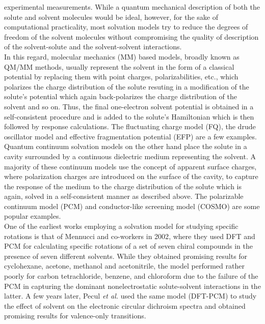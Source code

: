 experimental measurements. While a quantum mechanical description of both the solute and solvent molecules would be ideal, 
however, for the sake of computational practicality, most solvation models try to reduce the degrees of freedom of
the solvent molecules without compromising the quality of description of the solvent-solute and the solvent-solvent
interactions.\\
In this regard, molecular mechanics (MM) based models, broadly known as QM/MM methods, usually represent the
solvent in the form of a classical potential by replacing them with point charges, polarizabilities, etc.,\cite{}
which polarizes the charge distribution of the solute resuting in a modification of the solute's potential which
again back-polarizes the charge distribution of the solvent and so on. Thus, the final one-electron solvent potential is obtained in a
self-consistent procedure and is added to the solute's Hamiltonian which is then followed by response calculations. The fluctuating
charge model (FQ)\cite{}, the drude oscillator model\cite{} and effective fragmentation potential (EFP)\cite{} are a few 
examples.\\
Quantum continuum solvation models on the other hand place the solute in a cavity surrounded by a continuous
dielectric medium representing the solvent. A majority of these continuum models use the
concept of apparent surface charges\cite{}, where polarization charges are introduced on the surface of the 
cavity, to capture the response of the medium to the charge distribution of the solute which is again, 
solved in a self-consistent manner as described above. The polarizable continuum model (PCM) \cite{} and conductor-like 
screening model (COSMO) \cite{} are some popular examples.\\
One of the earliest works employing a solvation model for studying specific rotations is that of 
Mennucci and co-workers in 2002\cite{Mennucci02}, where they used DFT and PCM for calculating 
specific rotations of a set of seven chiral compounds in the presence of seven different 
solvents. While they obtained promising results for cyclohexane, acetone, methanol and 
acetonitrile, the model performed rather poorly for carbon tetrachloride, benzene, and chloroform
due to the failure of the PCM in capturing the dominant nonelectrostatic solute-solvent interactions 
in the latter. A few years later, Pecul {\em et al.} \cite{} used the same model (DFT-PCM) to study the effect
of solvent on the electronic circular dichroism spectra and obtained promising results for valence-only transitions. 
